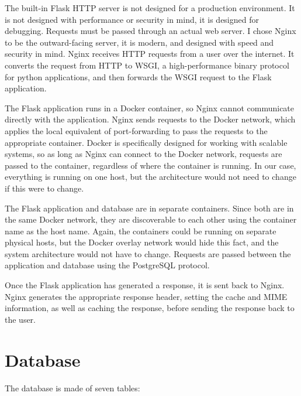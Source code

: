 The built-in Flask HTTP server is not designed for a production
environment.
It is not designed with performance or security in mind, it is designed
for debugging.
Requests must be passed through an actual web server.
I chose Nginx to be the outward-facing server, it is modern, and
designed with speed and security in mind.
Nginx receives HTTP requests from a user over the internet.
It converts the request from HTTP to WSGI, a high-performance binary
protocol for python applications, and then forwards the WSGI request to
the Flask application.

The Flask application runs in a Docker container, so Nginx cannot
communicate directly with the application. Nginx sends requests to the
Docker network, which applies the local equivalent of port-forwarding to
pass the requests to the appropriate container. Docker is specifically
designed for working with scalable systems, so as long as Nginx can
connect to the Docker network, requests are passed to the container,
regardless of where the container is running. In our case, everything is
running on one host, but the architecture would not need to change if
this were to change.

The Flask application and database are in separate containers. Since
both are in the same Docker network, they are discoverable to each other
using the container name as the host name. Again, the containers could
be running on separate physical hosts, but the Docker overlay network
would hide this fact, and the system architecture would not have to
change. Requests are passed between the application and database using
the PostgreSQL protocol.

Once the Flask application has generated a response, it is sent back to
Nginx. Nginx generates the appropriate response header, setting the
cache and MIME information, as well as caching the response, before
sending the response back to the user.

\section{Database}\label{sec:database}

The database is made of seven tables:

